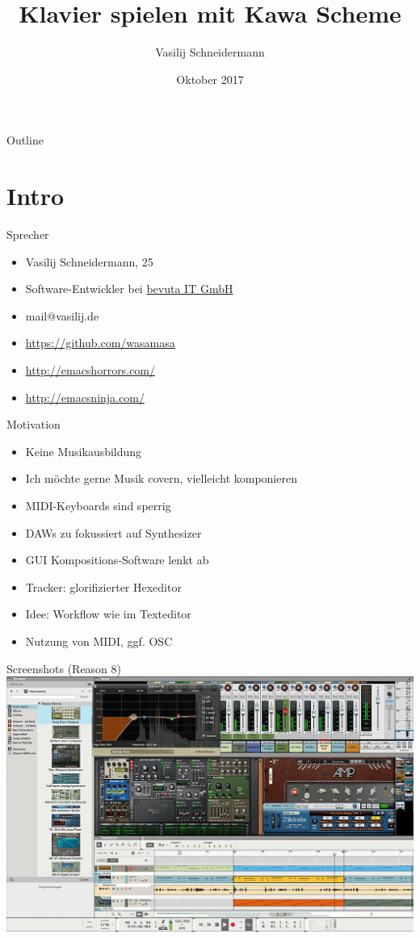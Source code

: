 \documentclass[presentation]{beamer}
\author{Vasilij Schneidermann}
\date{Oktober 2017}
\title{Klavier spielen mit Kawa Scheme}
\begin{document}
\maketitle
\begin{frame}{Outline}
\tableofcontents
\end{frame}

\AtBeginSection{\frame{\sectionpage}}

\section{Intro}
\label{sec-1}

\begin{frame}[label=sec-1-1]{Sprecher}
\begin{itemize}
\item Vasilij Schneidermann, 25
\item Software-Entwickler bei \href{https://www.bevuta.com/en/}{bevuta IT GmbH}
\item mail@vasilij.de
\item \url{https://github.com/wasamasa}
\item \url{http://emacshorrors.com/}
\item \url{http://emacsninja.com/}
\end{itemize}
\end{frame}

\begin{frame}[label=sec-1-2]{Motivation}
\begin{itemize}
\item Keine Musikausbildung
\item Ich möchte gerne Musik covern, vielleicht komponieren
\item MIDI-Keyboards sind sperrig
\item DAWs zu fokussiert auf Synthesizer
\item GUI Kompositions-Software lenkt ab
\item Tracker: glorifizierter Hexeditor
\item Idee: Workflow wie im Texteditor
\item Nutzung von MIDI, ggf. OSC
\end{itemize}
\end{frame}

\begin{frame}[label=sec-1-3]{Screenshots (Reason 8)}
\includegraphics[width=.9\linewidth]{./scrots/reason8.jpg}
\end{frame}
\end{document}
